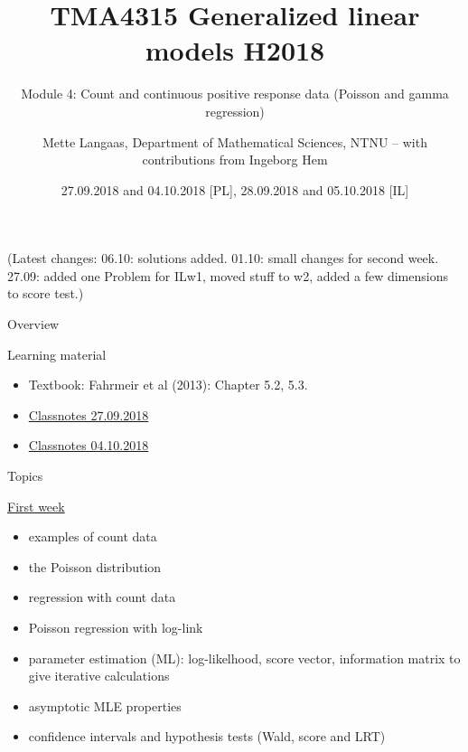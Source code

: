 \documentclass[
  ignorenonframetext,
]{beamer}
\title{TMA4315 Generalized linear models H2018}
\subtitle{Module 4: Count and continuous positive response data (Poisson
and gamma regression)}
\author{Mette Langaas, Department of Mathematical Sciences, NTNU -- with
contributions from Ingeborg Hem}
\date{27.09.2018 and 04.10.2018 {[}PL{]}, 28.09.2018 and 05.10.2018
{[}IL{]}}
\providecommand{\tightlist}{%
  \setlength{\itemsep}{0pt}\setlength{\parskip}{0pt}}
\begin{document}
\frame{\titlepage}

\begin{frame}
(Latest changes: 06.10: solutions added. 01.10: small changes for second
week. 27.09: added one Problem for ILw1, moved stuff to w2, added a few
dimensions to score test.)
\end{frame}

\begin{frame}{Overview}
\label{overview}
\begin{block}{Learning material}
\label{learning-material}
\begin{itemize}
\tightlist
\item
  Textbook: Fahrmeir et al (2013): Chapter 5.2, 5.3.
\item
  \href{https://www.math.ntnu.no/emner/TMA4315/2018h/TMA4315M4H20180927.pdf}{Classnotes
  27.09.2018}
\item
  \href{https://www.math.ntnu.no/emner/TMA4315/2018h/TMA4315M4H20181004.pdf}{Classnotes
  04.10.2018}
\end{itemize}
\end{block}
\end{frame}

\begin{frame}
\begin{block}{Topics}
\label{topics}
\begin{block}{\hyperlink{firstweek}{First week}}
\label{first-week}
\begin{itemize}
\tightlist
\item
  examples of count data
\item
  the Poisson distribution
\item
  regression with count data
\item
  Poisson regression with log-link
\item
  parameter estimation (ML): log-likelhood, score vector, information
  matrix to give iterative calculations
\item
  asymptotic MLE properties
\item
  confidence intervals and hypothesis tests (Wald, score and LRT)
\end{itemize}
\end{block}
\end{block}
\end{frame}
\end{document}
